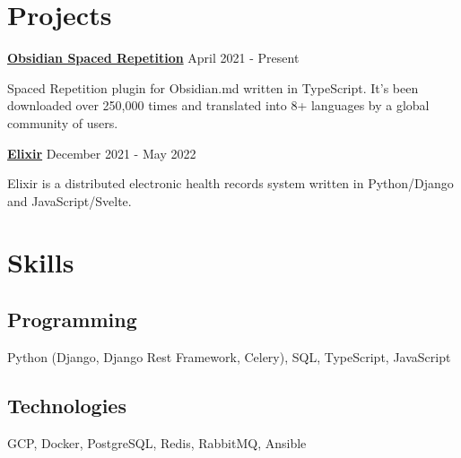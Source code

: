 \documentclass{article}
\newcommand{\experience}[4]{
    {\textbf{#1}} \hfill {#2} \\
    \ifthenelse{\equal{#3}{}}{}{
        {\textbf{\textit{#3}}} \hfill {\textit{#4}} \\
    }
    \vspace{0.5em}
}
\begin{document}

\section{Projects}
\experience
    {\href{https://github.com/st3v3nmw/obsidian-spaced-repetition}{\textcolor{tuftsblue}{Obsidian Spaced Repetition}}}
    {April 2021 - Present}{}{}
    Spaced Repetition plugin for Obsidian.md written in TypeScript.
    It's been downloaded over 250,000 times and translated into 8+ languages by a global
    community of users.
    \vspace{0.75em}
    \newline
\experience
    {\href{https://github.com/st3v3nmw/elixir-backend}{\textcolor{tuftsblue}{Elixir}}}
    {December 2021 - May 2022}{}{}
    Elixir is a distributed electronic health records system written in Python/Django and JavaScript/Svelte.


\section{Skills}
\subsection{Programming}
    Python (Django, Django Rest Framework, Celery), SQL, TypeScript, JavaScript
\subsection{Technologies}
    GCP, Docker, PostgreSQL, Redis, RabbitMQ, Ansible
\end{document}
